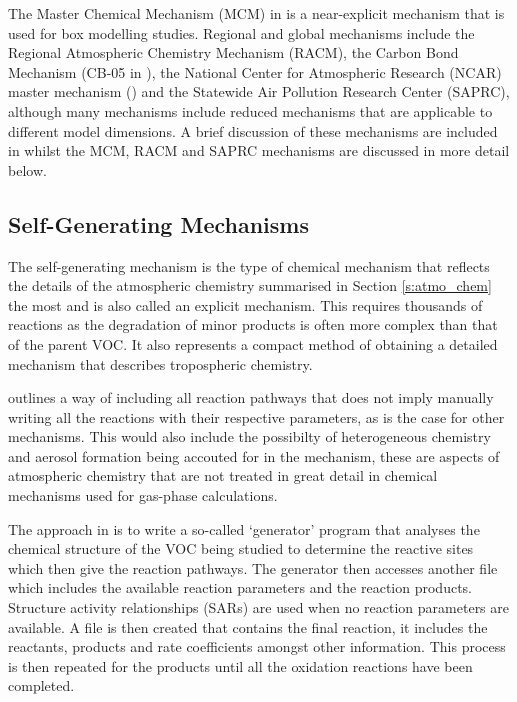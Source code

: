 The Master Chemical Mechanism (MCM) in \citep{Saunders:2003, Jenkin:2003} is a near-explicit mechanism that is used for box 
modelling studies. Regional and global mechanisms include the Regional Atmospheric Chemistry Mechanism (RACM), the Carbon Bond 
Mechanism (CB-05 in \citep{Yarwood:2005}), the National Center for Atmospheric Research (NCAR) master mechanism 
(\citep{Madronich:1989}) and the Statewide Air Pollution Research Center (SAPRC), although many mechanisms include reduced 
mechanisms that are applicable to different model dimensions. A brief discussion of these mechanisms are included in 
\citep{Russell:2000} whilst the MCM, RACM and SAPRC mechanisms are discussed in more detail below.

\subsection{Self-Generating Mechanisms}
The self-generating mechanism is the type of chemical mechanism that reflects the details of the atmospheric chemistry 
summarised in Section \ref{s:atmo_chem} the most and is also called an explicit mechanism. This requires thousands of reactions
as the degradation of minor products is often more complex than that of the parent VOC. It also represents a compact method of 
obtaining a detailed mechanism that describes tropospheric chemistry.

\citep{Aumont:2005} outlines a way of including all reaction pathways that does not imply manually writing all the reactions 
with their respective parameters, as is the case for other mechanisms. This would also include the possibilty of heterogeneous 
chemistry and aerosol formation being accouted for in the mechanism, these are aspects of atmospheric chemistry that are not 
treated in great detail in chemical mechanisms used for gas-phase calculations.

The approach in \citep{Aumont:2005} is to write a so-called `generator' program that analyses the chemical structure of the VOC 
being studied to determine the reactive sites which then give the reaction pathways. The generator then accesses another file 
which includes the available reaction parameters and the reaction products. Structure activity relationships (SARs) are used 
when no reaction parameters are available. A file is then created that contains the final reaction, it includes the reactants, 
products and rate coefficients amongst other information. This process is then repeated for the products until all the 
oxidation reactions have been completed.

